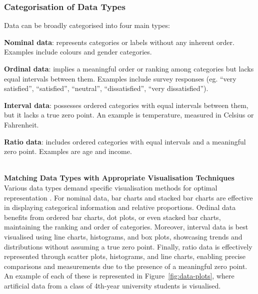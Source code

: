 \documentclass{article}\usepackage[]{graphicx}\usepackage[]{xcolor}
\numberwithin{equation}{section}
\begin{document}
\subsubsection{Categorisation of Data Types}
Data can be broadly categorised into four main types: 
\begin{itemise}
    \item \textbf{Nominal data}: represents categories or labels without any inherent order. Examples include colours and gender categories.
    \item \textbf{Ordinal data}: implies a meaningful order or ranking among categories but lacks equal intervals between them. Examples include survey responses (eg. “very satisfied”, “satisfied”, “neutral”, “dissatisfied”, “very dissatisfied”).
    \item \textbf{Interval data}: possesses ordered categories with equal intervals between them, but it lacks a true zero point. An example is temperature, measured in Celsius or Fahrenheit.
    \item \textbf{Ratio data}: includes ordered categories with equal intervals and a meaningful zero point. Examples are age and income.
\end{itemise}
\\

\noindent \textbf{Matching Data Types with Appropriate Visualisation Techniques}\\
\noindent Various data types demand specific visualisation methods for optimal representation \cite{healy2018data}. For nominal data, bar charts and stacked bar charts are effective in displaying categorical information and relative proportions. Ordinal data benefits from ordered bar charts, dot plots, or even stacked bar charts, maintaining the ranking and order of categories. Moreover, interval data is best visualised using line charts, histograms, and box plots, showcasing trends and distributions without assuming a true zero point. Finally, ratio data is effectively represented through scatter plots, histograms, and line charts, enabling precise comparisons and measurements due to the presence of a meaningful zero point. An example of each of these is represented in Figure~\ref{fig:data-plots}, where artificial data from a class of 4th-year university students is visualised.
\end{document}
